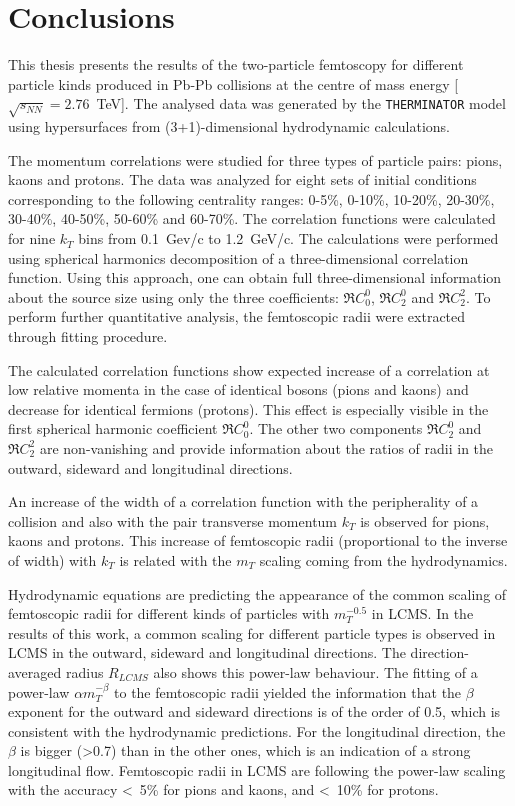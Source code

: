 \chapter*{Conclusions}
  This thesis presents the results of the two-particle femtoscopy for different particle kinds produced in Pb-Pb collisions at the centre of mass energy \mbox[$\sqrt{s_{NN}} = 2.76$~TeV].
  The analysed data was generated by the \verb|THERMINATOR| model using hypersurfaces from (3+1)-dimensional hydrodynamic calculations.

  The momentum correlations were studied for three types of particle pairs: pions, kaons and protons.
  The data was analyzed for eight sets of initial conditions corresponding to the following centrality ranges: 0-5\%, 0-10\%, 10-20\%, 20-30\%, 30-40\%, 40-50\%, 50-60\% and 60-70\%.
  The correlation functions were calculated for nine $k_T$ bins from 0.1~Gev/c to 1.2~GeV/c.
  The calculations were performed using spherical harmonics decomposition of a three-dimensional correlation function.
  Using this approach, one can obtain full three-dimensional information about the source size using only the three coefficients: $\Re C^0_0$, $\Re C^0_2$ and $\Re C^2_2$.
  To perform further quantitative analysis, the femtoscopic radii were extracted through fitting procedure.

  The calculated correlation functions show expected increase of a correlation at low relative momenta in the case of identical bosons (pions and kaons) and decrease for identical fermions (protons).
  This effect is especially visible in the first spherical harmonic coefficient $\Re C^0_0$.
  The other two components $\Re C^0_2$ and $\Re C^2_2$ are non-vanishing and provide information about the ratios of radii in the outward, sideward and longitudinal directions.

  An increase of the width of a correlation function with the peripherality of a collision and also with the pair transverse momentum $k_T$ is observed for pions, kaons and protons.
  This increase of femtoscopic radii (proportional to the inverse of width) with $k_T$ is related with the $m_T$ scaling coming from the hydrodynamics.

  Hydrodynamic equations are predicting the appearance of the common scaling of femtoscopic radii for different kinds of particles with $m_T^{-0.5}$ in LCMS.
  In the results of this work, a common scaling for different particle types is observed in LCMS in the outward, sideward and longitudinal directions.
  The direction-averaged radius $R_{LCMS}$ also shows this power-law behaviour.
  The fitting of a power-law $\alpha m_T^{-\beta}$ to the femtoscopic radii yielded the information that the $\beta$ exponent for the outward and sideward directions is of the order of 0.5, which is consistent with the hydrodynamic predictions.
  For the longitudinal direction, the $\beta$ is bigger (>0.7) than in the other ones, which is an indication of a strong longitudinal flow.
  Femtoscopic radii in LCMS are following the power-law scaling with the accuracy <~5\% for pions and kaons, and <~10\% for protons.
  
